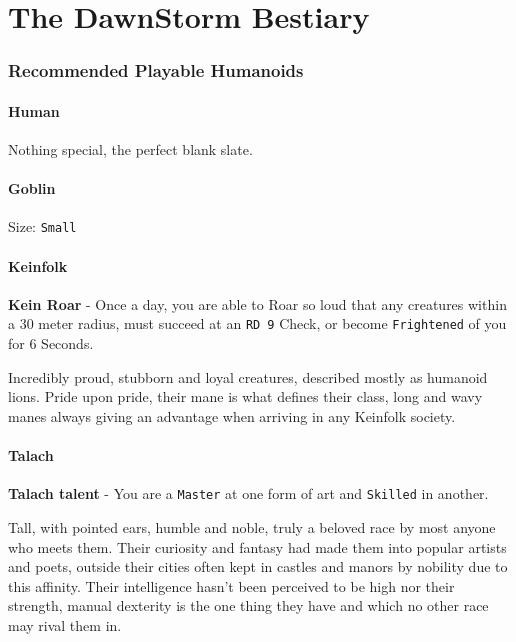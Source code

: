 \chapter{The DawnStorm Bestiary}

\hypertarget{recommended-playable-humanoids}{%
\subsection{Recommended Playable
Humanoids}\label{recommended-playable-humanoids}}

\hypertarget{human}{%
\subsubsection{Human}\label{human}}

Nothing special, the perfect blank slate.

\hypertarget{goblin}{%
\subsubsection{Goblin}\label{goblin}}

Size: \texttt{Small}

\hypertarget{keinfolk}{%
\subsubsection{Keinfolk}\label{keinfolk}}

\textbf{Kein Roar} - Once a day, you are able to Roar so loud that any
creatures within a 30 meter radius, must succeed at an \texttt{RD\ 9}
Check, or become \texttt{Frightened} of you for 6 Seconds.

Incredibly proud, stubborn and loyal creatures, described mostly as
humanoid lions. Pride upon pride, their mane is what defines their
class, long and wavy manes always giving an advantage when arriving in
any Keinfolk society.

\hypertarget{talach}{%
\subsubsection{Talach}\label{talach}}

\textbf{Talach talent} - You are a \texttt{Master} at one form of art
and \texttt{Skilled} in another.

Tall, with pointed ears, humble and noble, truly a beloved race by most
anyone who meets them. Their curiosity and fantasy had made them into
popular artists and poets, outside their cities often kept in castles
and manors by nobility due to this affinity. Their intelligence hasn't
been perceived to be high nor their strength, manual dexterity is the
one thing they have and which no other race may rival them in.

